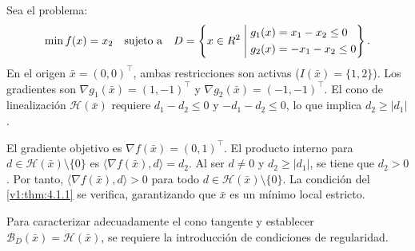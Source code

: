 \begin{example}\label{v1:exa:suficiencia_primal}
 Sea el problema:
 \[
 \min f(x) = x_2 \quad \text{sujeto a} \quad D = \left\{ x \in R^2 \mathrel{\Bigg|} \begin{aligned} &g_1(x) = x_1 - x_2 \le 0 \\ &g_2(x) = -x_1 - x_2 \le 0 \end{aligned} \right\}.
 \]
 En el origen $\bar{x} = (0,0)^\top$, ambas restricciones son activas ($I(\bar{x}) = \{1, 2\}$). Los gradientes son $\nabla g_1(\bar{x}) = (1, -1)^\top$ y $\nabla g_2(\bar{x}) = (-1, -1)^\top$. El cono de linealización $\mathcal{H}(\bar{x})$ requiere $d_1 - d_2 \le 0$ y $-d_1 - d_2 \le 0$, lo que implica $d_2 \ge |d_1|$.
 
 El gradiente objetivo es $\nabla f(\bar{x}) = (0, 1)^\top$. El producto interno para $d \in \mathcal{H}(\bar{x}) \setminus \{0\}$ es $\langle \nabla f(\bar{x}), d \rangle = d_2$. Al ser $d \neq 0$ y $d_2 \ge |d_1|$, se tiene que $d_2 > 0$. Por tanto, $\langle \nabla f(\bar{x}), d \rangle > 0$ para todo $d \in \mathcal{H}(\bar{x}) \setminus \{0\}$. La condición del \cref{v1:thm:4.1.1} se verifica, garantizando que $\bar{x}$ es un mínimo local estricto.
\end{example}

Para caracterizar adecuadamente el cono tangente y establecer $\mathcal{B}_D(\bar{x}) = \mathcal{H}(\bar{x})$, se requiere la introducción de condiciones de regularidad.

